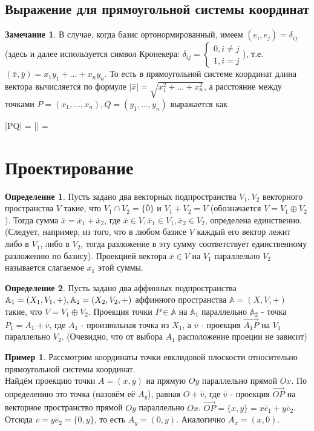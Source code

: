 \documentclass[a4paper, 12pt]{article}
\theoremstyle{definition}
\newtheorem*{definition}{Определение}
\newtheorem*{remark}{Замечание}
\newtheorem*{example}{Пример}
\newenvironment{boxedalign*}
  {\begin{equation*}\begin{lrbox}{\boxedalignbox}$\begin{aligned}}
  {\end{aligned}$\end{lrbox}\fbox{\usebox{\boxedalignbox}}\end{equation*}}
\begin{document}
	\subsection{Выражение для прямоугольной системы координат}
	\begin{remark}
		В случае, когда базис ортонормированный, имеем $(e_{i}, e_{j}) = \delta_{ij}$ (здесь и далее используется символ Кронекера: $\delta_{ij} = \begin{cases} 0, i \neq j \\ 1, i = j\end{cases}$), т.е. $(\bar{x}, \bar{y}) = x_{1}y_{1}+...+x_{n}y_{n}$. То есть в прямоугольной системе координат длина вектора вычисляется по формуле $|\bar{x}| = \sqrt{x_{1}^2+...+x_{n}^2}$, а расстояние между точками $P = (x_{1},...,x_{n}), Q = (y_{1},...,y_{n})$ выражается как \begin{boxedalign*}|PQ| = || =  \end{boxedalign*}
	\end{remark}
	\section{Проектирование}
	\begin{definition}
		Пусть задано два векторных подпространства $V_{1}, V_{2}$ векторного пространства $V$ такие, что $V_{1} \cap V_{2} = \{\bar{0}\}$ и $V_{1} + V_{2} = V$ (обозначается $V = V_{1} \oplus V_{2}$). Тогда сумма $\bar{x} = \bar{x}_{1} + \bar{x}_{2}$, где $\bar{x} \in V, \bar{x}_{1} \in V_{1}, \bar{x}_{2} \in V_{2}$, определена единственно. (Следует, например, из того, что в любом базисе $V$ каждый его вектор лежит либо в $V_{1}$, либо в $V_{2}$, тогда разложение в эту сумму соответствует единственному разложению по базису). Проекцией вектора $\bar{x} \in V$ на $V_{1}$ параллельно $V_{2}$ называется слагаемое $\bar{x_{1}}$ этой суммы. 
	\end{definition}
	\begin{definition}
		Пусть задано два аффинных подпространства $\mathbb{A}_{1} = (X_{1}, V_{1}, +),\\ \mathbb{A}_{2} = (X_{2}, V_{2}, +)$ аффинного пространства $\mathbb{A} = (X, V, +)$ такие, что $V = V_{1} \oplus V_{2}$. Проекция точки $P \in \mathbb{A}$ на $\mathbb{A}_{1}$ параллельно $\mathbb{A}_{2}$ - точка $P_{1} = A_{1} + \bar{v}$, где $A_{1}$ - произвольная точка из $X_{1}$, а $\bar{v}$ - проекция $\overrightarrow{A_{1}P}$ на $V_{1}$ параллельно $V_{2}$.
		(Очевидно, что от выбора $A_{1}$ расположение проеции не зависит)
	\end{definition}
	\begin{example}
		Рассмотрим координаты точки евклидовой плоскости относительно прямоугольной системы координат. \\
		Найдём проекцию точки $A = (x, y)$ на прямую $Oy$ параллельно прямой $Ox$. По определению это точка (назовём её $A_{y}$), равная $O + \bar{v}$, где $\bar{v}$ - проекция $\overrightarrow{OP}$ на векторное пространство прямой $Oy$ параллельно $Ox$. $\overrightarrow{OP} = \{x, y\} = x\bar{e}_{1} + y\bar{e}_{2}$. Отсюда $\bar{v} = y\bar{e}_{2} = \{0, y\}$, то есть $A_{y} = (0, y)$. Аналогично $A_{x} = (x, 0)$. 
	\end{example}
\end{document}
